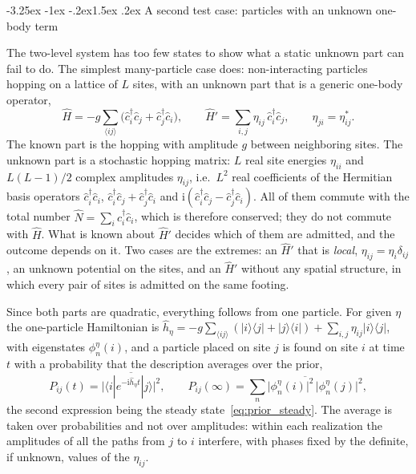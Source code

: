 \documentclass[10pt,a4paper]{article}
\makeatletter
\renewcommand{\subsection}{\@startsection{subsection}{2}{\z@}%
  {-3.25ex \@plus -1ex \@minus -.2ex}{1.5ex \@plus .2ex}%
  {\normalfont\fontsize{15.5pt}{19pt}\selectfont\bfseries}}
\newcommand{\ii}{\mathrm{i}}
\makeatother
\begin{document}
\subsection{A second test case: particles with an unknown one-body term}
\label{sec:found_anderson}

The two-level system has too few states to show what a static unknown part can fail to do.
The simplest many-particle case does: non-interacting particles hopping on a lattice of $ L $ sites, with an unknown part that is a generic one-body operator,
\[
  \hat H = -g\sum_{\langle ij\rangle}\big(\hat c_i^\dagger\hat c_j + \hat c_j^\dagger\hat c_i\big) ,
  \qquad
  \hat H' = \sum_{i,j}\eta_{ij}\,\hat c_i^\dagger\hat c_j , \qquad \eta_{ji} = \eta_{ij}^{*} .
\]
The known part is the hopping with amplitude $ g $ between neighboring sites.
The unknown part is a stochastic hopping matrix: $ L $ real site energies $ \eta_{ii} $ and $ L(L-1)/2 $ complex amplitudes $ \eta_{ij} $, i.e.\ $ L^{2} $ real coefficients of the Hermitian basis operators $ \hat c_i^\dagger\hat c_i $, $ \hat c_i^\dagger\hat c_j + \hat c_j^\dagger\hat c_i $ and $ \ii(\hat c_i^\dagger\hat c_j - \hat c_j^\dagger\hat c_i) $.
All of them commute with the total number $ \hat N = \sum_i\hat c_i^\dagger\hat c_i $, which is therefore conserved; they do not commute with $ \hat H $.
What is known about $ \hat H' $ decides which of them are admitted, and the outcome depends on it.
Two cases are the extremes: an $ \hat H' $ that is \emph{local}, $ \eta_{ij} = \eta_i\delta_{ij} $, an unknown potential on the sites, and an $ \hat H' $ without any spatial structure, in which every pair of sites is admitted on the same footing.

Since both parts are quadratic, everything follows from one particle.
For given $ \eta $ the one-particle Hamiltonian is $ \hat h_\eta = -g\sum_{\langle ij\rangle}(|i\rangle\langle j| + |j\rangle\langle i|) + \sum_{i,j}\eta_{ij}|i\rangle\langle j| $, with eigenstates $ \phi_n^{\eta}(i) $, and a particle placed on site $ j $ is found on site $ i $ at time $ t $ with a probability that the description averages over the prior,
\[
  P_{ij}(t) = \overline{\big|\langle i|e^{-\ii \hat h_\eta t}|j\rangle\big|^{2}} ,
  \qquad
  P_{ij}(\infty) = \overline{\sum_n\big|\phi_n^{\eta}(i)\big|^{2}\,\big|\phi_n^{\eta}(j)\big|^{2}} ,
\]
the second expression being the steady state~\eqref{eq:prior_steady}.
The average is taken over probabilities and not over amplitudes: within each realization the amplitudes of all the paths from $ j $ to $ i $ interfere, with phases fixed by the definite, if unknown, values of the $ \eta_{ij} $.
\end{document}
